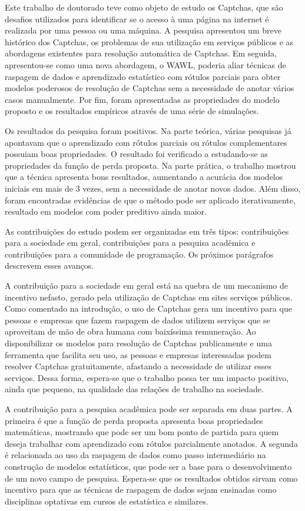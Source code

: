 \documentclass[12pt,twoside,brazilian]{book}
\begin{document}
Este trabalho de doutorado teve como objeto de estudo os Captchas, que
são desafios utilizados para identificar se o acesso à uma página na
internet é realizada por uma pessoa ou uma máquina. A pesquisa
apresentou um breve histórico dos Captchas, os problemas de sua
utilização em serviços públicos e as abordagens existentes para
resolução automática de Captchas. Em seguida, apresentou-se como uma
nova abordagem, o WAWL, poderia aliar técnicas de raspagem de dados e
aprendizado estatístico com rótulos parciais para obter modelos
poderosos de resolução de Captchas sem a necessidade de anotar vários
casos manualmente. Por fim, foram apresentadas as propriedades do modelo
proposto e os resultados empíricos através de uma série de simulações.

Os resultados da pesquisa foram positivos. Na parte teórica, várias
pesquisas já apontavam que o aprendizado com rótulos parciais ou rótulos
complementares possuiam boas propriedades. O resultado foi verificado a
estudando-se as propriedades da função de perda proposta. Na parte
prática, o trabalho mostrou que a técnica apresenta bons resultados,
aumentando a acurácia dos modelos iniciais em mais de 3 vezes, sem a
necessidade de anotar novos dados. Além disso, foram encontradas
evidências de que o método pode ser aplicado iterativamente, resultado
em modelos com poder preditivo ainda maior.

As contribuições do estudo podem ser organizadas em três tipos:
contribuições para a sociedade em geral, contribuições para a pesquisa
acadêmica e contribuições para a comunidade de programação. Os próximos
parágrafos descrevem esses avanços.

A contribuição para a sociedade em geral está na quebra de um mecanismo
de incentivo nefasto, gerado pela utilização de Captchas em sites
serviços públicos. Como comentado na introdução, o uso de Captchas gera
um incentivo para que pessoas e empresas que fazem raspagem de dados
utilizem serviços que se aproveitam de mão de obra humana com baixíssima
remuneração. Ao disponibilizar os modelos para resolução de Captchas
publicamente e uma ferramenta que facilita seu uso, as pessoas e
empresas interessadas podem resolver Captchas gratuitamente, afastando a
necessidade de utilizar esses serviços. Dessa forma, espera-se que o
trabalho possa ter um impacto positivo, ainda que pequeno, na qualidade
das relações de trabalho na sociedade.

A contribuição para a pesquisa acadêmica pode ser separada em duas
partes. A primeira é que a função de perda proposta apresenta boas
propriedades matemáticas, mostrando que pode ser um bom ponto de partida
para quem deseja trabalhar com aprendizado com rótulos parcialmente
anotados. A segunda é relacionada ao uso da raspagem de dados como passo
intermediário na construção de modelos estatísticos, que pode ser a base
para o desenvolvimento de um novo campo de pesquisa. Espera-se que os
resultados obtidos sirvam como incentivo para que as técnicas de
raspagem de dados sejam ensinadas como disciplinas optativas em cursos
de estatística e similares.
\end{document}
